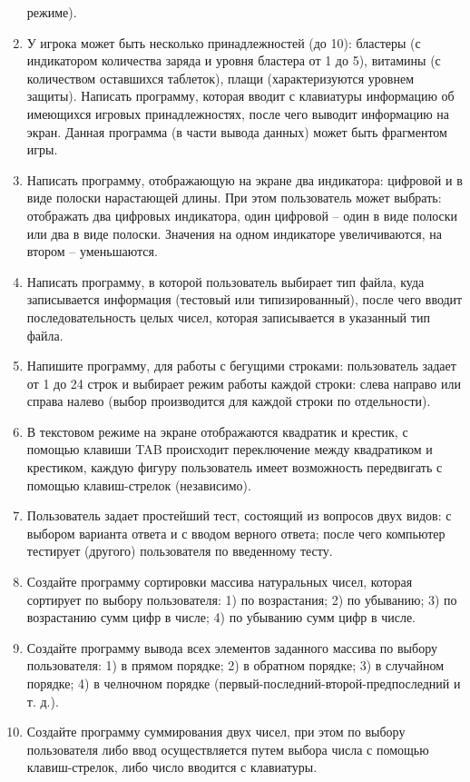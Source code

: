 \documentclass[12pt]{article}
\begin{document}
\begin{enumerate}
режиме).
\item У игрока может быть несколько принадлежностей (до 10): бластеры (с индикатором количества заряда и уровня
бластера от 1 до 5), 
витамины (с количеством оставшихся таблеток), плащи (характеризуются уровнем защиты). Написать программу, которая 
вводит с клавиатуры информацию об имеющихся игровых принадлежностях, после чего выводит информацию на экран.
Данная программа (в части вывода данных) может быть фрагментом игры.
\item Написать программу, отображающую на экране два индикатора: цифровой и в виде полоски нарастающей длины. 
При этом пользователь может выбрать: отображать два цифровых индикатора, один цифровой -- один в виде
полоски или два в виде полоски. Значения на одном индикаторе увеличиваются, на втором -- уменьшаются.
\item Написать программу, в которой пользователь выбирает тип файла, куда записывается информация 
(тестовый или типизированный), после чего вводит последовательность целых чисел, которая записывается
в указанный тип файла.
\item Напишите программу, для работы с бегущими строками: пользователь задает от 1 до 24 строк и выбирает
режим работы каждой строки: слева направо или справа налево (выбор производится для каждой строки по отдельности).
\item В текстовом режиме на экране отображаются квадратик и крестик, с помощью клавиши TAB происходит переключение
между квадратиком и крестиком, каждую фигуру пользователь имеет возможность передвигать с помощью клавиш-стрелок (независимо).
\item Пользователь задает простейший тест, состоящий из вопросов двух видов: с выбором варианта ответа и с вводом верного 
ответа; после чего компьютер тестирует (другого) пользователя по введенному тесту.
\item Создайте программу сортировки массива натуральных чисел, которая сортирует по выбору пользователя: 
1) по возрастания; 2) по убыванию; 3) по возрастанию сумм цифр в числе; 4) по убыванию сумм цифр в числе.
\item Создайте программу вывода всех элементов заданного массива по выбору пользователя: 1) в прямом порядке; 2)
в обратном порядке; 3) в случайном порядке; 4) в челночном порядке (первый-последний-второй-предпоследний и т. д.).
\item Создайте программу суммирования двух чисел, при этом по выбору пользователя либо ввод осуществляется путем выбора
числа с помощью клавиш-стрелок, либо число вводится с клавиатуры.

\end{enumerate}
\end{document}
